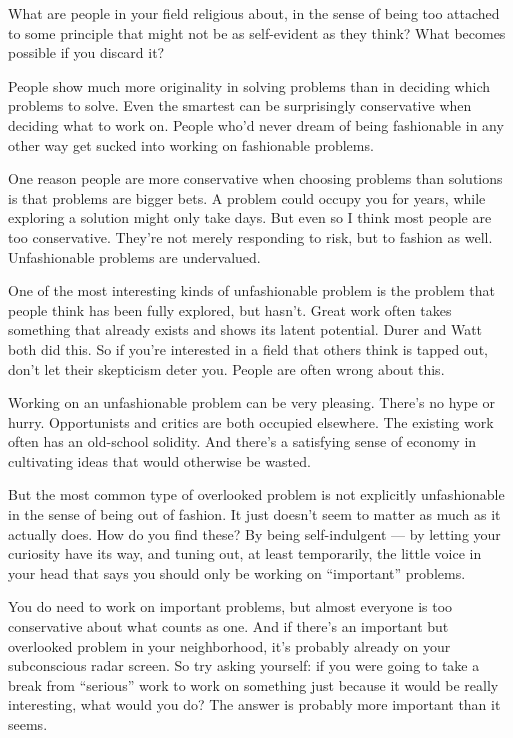 What are people in your field religious about, in the sense of being too
attached to some principle that might not be as self-evident as they
think? What becomes possible if you discard it?

People show much more originality in solving problems than in deciding
which problems to solve. Even the smartest can be surprisingly
conservative when deciding what to work on. People who'd never dream of
being fashionable in any other way get sucked into working on
fashionable problems.

One reason people are more conservative when choosing problems than
solutions is that problems are bigger bets. A problem could occupy you
for years, while exploring a solution might only take days. But even so
I think most people are too conservative. They're not merely responding
to risk, but to fashion as well. Unfashionable problems are undervalued.

One of the most interesting kinds of unfashionable problem is the
problem that people think has been fully explored, but hasn't. Great
work often takes something that already exists and shows its latent
potential. Durer and Watt both did this. So if you're interested in a
field that others think is tapped out, don't let their skepticism deter
you. People are often wrong about this.

Working on an unfashionable problem can be very pleasing. There's no
hype or hurry. Opportunists and critics are both occupied elsewhere. The
existing work often has an old-school solidity. And there's a satisfying
sense of economy in cultivating ideas that would otherwise be wasted.

But the most common type of overlooked problem is not explicitly
unfashionable in the sense of being out of fashion. It just doesn't seem
to matter as much as it actually does. How do you find these? By being
self-indulgent --- by letting your curiosity have its way, and tuning
out, at least temporarily, the little voice in your head that says you
should only be working on ``important'' problems.

You do need to work on important problems, but almost everyone is too
conservative about what counts as one. And if there's an important but
overlooked problem in your neighborhood, it's probably already on your
subconscious radar screen. So try asking yourself: if you were going to
take a break from ``serious'' work to work on something just because it
would be really interesting, what would you do? The answer is probably
more important than it seems.

